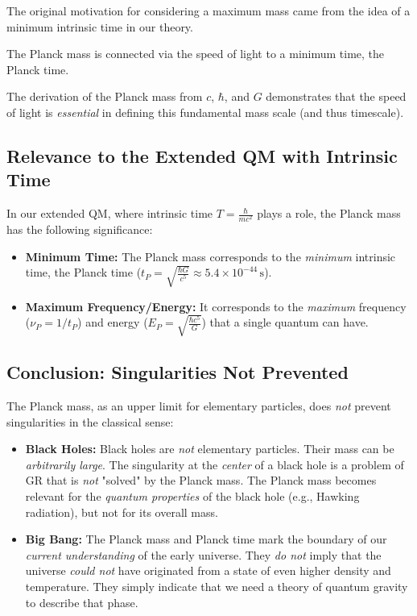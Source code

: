 \documentclass{article}
\begin{document}
	The original motivation for considering a maximum mass came from the idea of a minimum intrinsic time in our theory.
	
	The Planck mass is connected via the speed of light to a minimum time, the Planck time.
	
	The derivation of the Planck mass from $c$, $\hbar$, and $G$ demonstrates that the speed of light is \textit{essential} in defining this fundamental mass scale (and thus timescale).
	
	\subsection{Relevance to the Extended QM with Intrinsic Time}
	
	In our extended QM, where intrinsic time $T = \frac{\hbar}{mc^2}$ plays a role, the Planck mass has the following significance:
	
	\begin{itemize}
		\item \textbf{Minimum Time:} The Planck mass corresponds to the \textit{minimum} intrinsic time, the Planck time ($t_P = \sqrt{\frac{\hbar G}{c^5}} \approx 5.4 \times 10^{-44} \, \text{s}$).
		\item \textbf{Maximum Frequency/Energy:} It corresponds to the \textit{maximum} frequency ($\nu_P = 1/t_P$) and energy ($E_P = \sqrt{\frac{\hbar c^5}{G}}$) that a single quantum can have.
	\end{itemize}
	
	\subsection{Conclusion: Singularities Not Prevented}
	
	The Planck mass, as an upper limit for elementary particles, does \textit{not} prevent singularities in the classical sense:
	
	\begin{itemize}
		\item \textbf{Black Holes:} Black holes are \textit{not} elementary particles. Their mass can be \textit{arbitrarily large}. The singularity at the \textit{center} of a black hole is a problem of GR that is \textit{not} "solved" by the Planck mass. The Planck mass becomes relevant for the \textit{quantum properties} of the black hole (e.g., Hawking radiation), but not for its overall mass.
		\item \textbf{Big Bang:} The Planck mass and Planck time mark the boundary of our \textit{current understanding} of the early universe. They \textit{do not} imply that the universe \textit{could not} have originated from a state of even higher density and temperature. They simply indicate that we need a theory of quantum gravity to describe that phase.
	\end{itemize}
	
\end{document}
